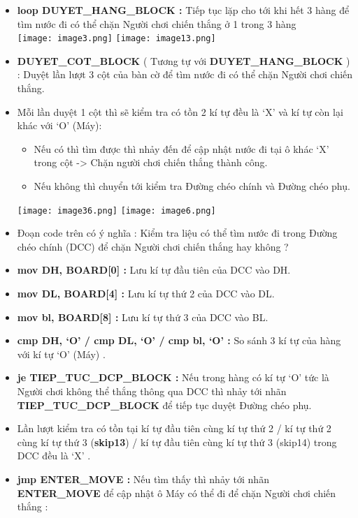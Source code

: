 \begin{itemize}
    \item \textbf{loop DUYET\_HANG\_BLOCK :} Tiếp tục lặp cho tới khi hết 3 hàng để  tìm nước đi có thể chặn Người chơi chiến thắng ở 1 trong 3 hàng  \\
    \texttt{[image: image3.png]}
    \texttt{[image: image13.png]}
    \item \textbf{DUYET\_COT\_BLOCK }( Tương tự với \textbf{DUYET\_HANG\_BLOCK} )  : Duyệt lần lượt 3 cột của bàn cờ để tìm nước đi có thể chặn Người chơi chiến thắng.
    \item Mỗi lần duyệt 1 cột thì sẽ kiểm tra có tồn 2 kí tự đều là ‘X’ và kí tự còn lại khác với ‘O’ (Máy): 
    \begin{itemize}
        \item Nếu có thì tìm được thì nhảy đến  để cập nhật nước đi tại ô khác ‘X’ trong cột -> Chặn người chơi chiến thắng thành công.
        \item Nếu không thì chuyển tới kiểm tra Đường chéo chính và Đường chéo phụ.
    \end{itemize}
    \texttt{[image: image36.png]}
    \texttt{[image: image6.png]}
    \item Đoạn code trên có ý nghĩa : Kiểm tra liệu có thể tìm nước đi trong Đường chéo chính (DCC) để chặn Người chơi chiến thắng hay không ?
    \item \textbf{mov DH, BOARD[0] : }Lưu kí tự đầu tiên của DCC vào DH.
    \item \textbf{mov DL, BOARD[4] : }Lưu kí tự thứ 2 của DCC vào DL.
    \item \textbf{mov bl, BOARD[8] :} Lưu kí tự thứ 3 của DCC vào BL.
    \item \textbf{cmp DH, ‘O’ / cmp DL, ‘O’ / cmp bl, ‘O’ :}  So sánh 3 kí tự của hàng với kí tự ‘O’ (Máy) .
    \item \textbf{je TIEP\_TUC\_DCP\_BLOCK :} Nếu trong hàng có kí tự ‘O’ tức là Người chơi không thể thắng thông qua DCC thì nhảy tới nhãn \textbf{TIEP\_TUC\_DCP\_BLOCK} để tiếp tục duyệt Đường chéo phụ.
    \item Lần lượt kiểm tra có tồn tại kí tự đầu tiên cùng kí tự thứ 2 / kí tự thứ 2 cùng kí tự thứ 3 (\textbf{skip13}) / kí tự đầu tiên cùng kí tự thứ 3 (skip14) trong DCC đều là ‘X’ .
    \item \textbf{jmp ENTER\_MOVE :} Nếu tìm thấy thì nhảy tới nhãn \textbf{ENTER\_MOVE} để cập nhật ô Máy có thể đi để chặn Người chơi chiến thắng : 
    \begin{itemize}

\end{itemize}
\end{itemize}
